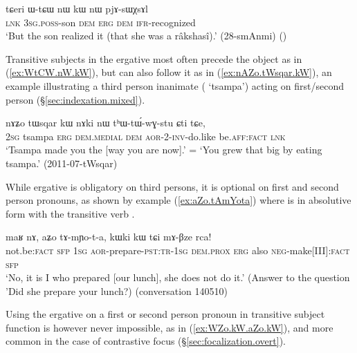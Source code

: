 \begin{exe}
\ex \label{ex:WtCW.nW.kW}
\gll tɕeri ɯ-tɕɯ nɯ kɯ nɯ pjɤ-sɯχsɤl \\
\textsc{lnk} \textsc{3sg}.\textsc{poss}-son \textsc{dem} \textsc{erg} \textsc{dem} \textsc{ifr}-recognized \\
\glt `But the son realized it (that she was a râkshasî).' (28-smAnmi)
()
\end{exe}

Transitive subjects in the ergative most often precede the object as in (\ref{ex:WtCW.nW.kW}), but can also follow it as in (\ref{ex:nAZo.tWsqar.kW}), an example illustrating a third person inanimate ( `tsampa') acting on first/second person (§\ref{sec:indexation.mixed}).

\begin{exe}
\ex \label{ex:nAZo.tWsqar.kW}
\gll nɤʑo tɯsqar kɯ nɤki nɯ tʰɯ-tɯ́-wɣ-stu ɕti tɕe,  \\
\textsc{2sg} tsampa \textsc{erg} \textsc{dem}.\textsc{medial} \textsc{dem} \textsc{aor}-2-\textsc{inv}-do.like be.\textsc{aff}:\textsc{fact} \textsc{lnk} \\
\glt `Tsampa made you the [way you are now].' = `You grew that big by eating tsampa.' (2011-07-tWsqar)
\end{exe}

While ergative is obligatory on third persons, it is optional on first and second person pronouns, as shown by example (\ref{ex:aZo.tAmYota}) where  is in absolutive form with the transitive verb . 

\begin{exe}
\ex \label{ex:aZo.tAmYota}
\gll maʁ nɤ, aʑo tɤ-mɲo-t-a, kɯki kɯ tɕi mɤ-βze rca!  \\
not.be:\textsc{fact} \textsc{sfp} \textsc{1sg} \textsc{aor}-prepare-\textsc{pst}:\textsc{tr}-\textsc{1sg} \textsc{dem}.\textsc{prox} \textsc{erg} also \textsc{neg}-make[III]:\textsc{fact} \textsc{sfp} \\
\glt `No, it is I who prepared [our lunch], she does not do it.' (Answer to the question 'Did she prepare your lunch?) (conversation 140510)
\end{exe}

Using the ergative on a first  or second person pronoun in transitive subject function is however never impossible, as in (\ref{ex:WZo.kW.aZo.kW}), and more common in the case of contrastive focus (§\ref{sec:focalization.overt}).


